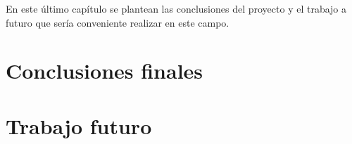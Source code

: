 En este último capítulo se plantean las conclusiones del proyecto y el trabajo a futuro que sería conveniente realizar en este campo.

\section{Conclusiones finales}

 \section{Trabajo futuro}